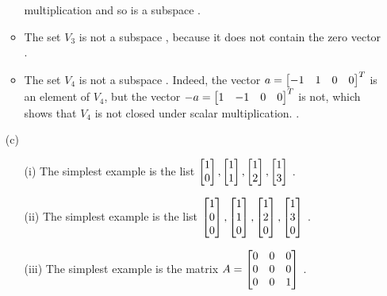 \documentclass[a4paper]{article}
\begin{document}
\begin{solution}
\begin{itemize}
\begin{itemize}
     multiplication and so is a subspace . 
    \item The set $V_3$ is not a subspace \mk, because it does
     not contain the zero vector \mk.
    \item The set $V_4$ is not a subspace \mk.  Indeed, the vector
     $a=\left[\begin{matrix} -1&1&0&0\end{matrix}\right]^T$ is an element of $V_4$, but the vector
     $-a=\left[\begin{matrix} 1&-1&0&0\end{matrix}\right]^T$ is not, which shows that $V_4$ is not
     closed under scalar multiplication. \mk.
   \end{itemize}
  \item[(c)] 
   \begin{itemize}
    \item[(i)] The simplest example is the list
     $\left[\begin{matrix} 1\\0\end{matrix}\right],\left[\begin{matrix} 1\\1\end{matrix}\right],\left[\begin{matrix} 1\\2\end{matrix}\right],\left[\begin{matrix} 1\\3\end{matrix}\right]$ .
    \item[(ii)] The simplest example is the list
     $\left[\begin{matrix} 1\\0\\0\end{matrix}\right],
      \left[\begin{matrix} 1\\1\\0\end{matrix}\right],
      \left[\begin{matrix} 1\\2\\0\end{matrix}\right],
      \left[\begin{matrix} 1\\3\\0\end{matrix}\right]$ .
    \item[(iii)] The simplest example is the matrix 
     $A=\left[\begin{matrix} 0&0&0\\0&0&0\\0&0&1\end{matrix}\right]$ .
   \end{itemize}
 \end{itemize}
\end{solution}
\end{document}
